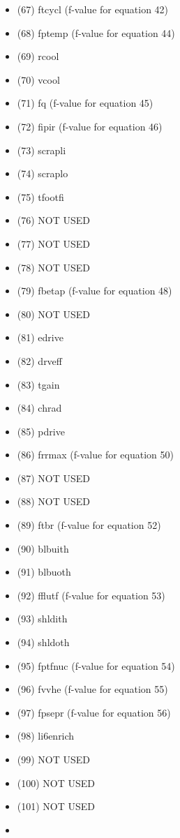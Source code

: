 \documentclass[]{article}
\begin{document}
\begin{itemize}
\begin{itemize}
    (66) ftohs (f-value for equation 41)
  \item
    (67) ftcycl (f-value for equation 42)
  \item
    (68) fptemp (f-value for equation 44)
  \item
    (69) rcool
  \item
    (70) vcool
  \item
    (71) fq (f-value for equation 45)
  \item
    (72) fipir (f-value for equation 46)
  \item
    (73) scrapli
  \item
    (74) scraplo
  \item
    (75) tfootfi
  \item
    (76) NOT USED
  \item
    (77) NOT USED
  \item
    (78) NOT USED
  \item
    (79) fbetap (f-value for equation 48)
  \item
    (80) NOT USED
  \item
    (81) edrive
  \item
    (82) drveff
  \item
    (83) tgain
  \item
    (84) chrad
  \item
    (85) pdrive
  \item
    (86) frrmax (f-value for equation 50)
  \item
    (87) NOT USED
  \item
    (88) NOT USED
  \item
    (89) ftbr (f-value for equation 52)
  \item
    (90) blbuith
  \item
    (91) blbuoth
  \item
    (92) fflutf (f-value for equation 53)
  \item
    (93) shldith
  \item
    (94) shldoth
  \item
    (95) fptfnuc (f-value for equation 54)
  \item
    (96) fvvhe (f-value for equation 55)
  \item
    (97) fpsepr (f-value for equation 56)
  \item
    (98) li6enrich
  \item
    (99) NOT USED
  \item
    (100) NOT USED
  \item
    (101) NOT USED
  \item

\end{itemize}
\end{itemize}
\end{document}

